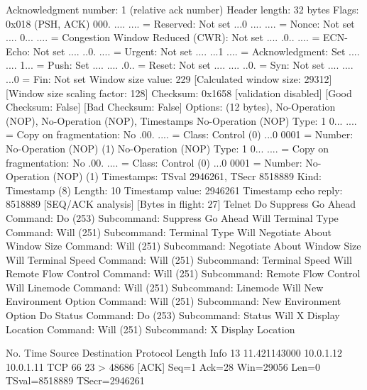     Acknowledgment number: 1    (relative ack number)
    Header length: 32 bytes
    Flags: 0x018 (PSH, ACK)
        000. .... .... = Reserved: Not set
        ...0 .... .... = Nonce: Not set
        .... 0... .... = Congestion Window Reduced (CWR): Not set
        .... .0.. .... = ECN-Echo: Not set
        .... ..0. .... = Urgent: Not set
        .... ...1 .... = Acknowledgment: Set
        .... .... 1... = Push: Set
        .... .... .0.. = Reset: Not set
        .... .... ..0. = Syn: Not set
        .... .... ...0 = Fin: Not set
    Window size value: 229
    [Calculated window size: 29312]
    [Window size scaling factor: 128]
    Checksum: 0x1658 [validation disabled]
        [Good Checksum: False]
        [Bad Checksum: False]
    Options: (12 bytes), No-Operation (NOP), No-Operation (NOP), Timestamps
        No-Operation (NOP)
            Type: 1
                0... .... = Copy on fragmentation: No
                .00. .... = Class: Control (0)
                ...0 0001 = Number: No-Operation (NOP) (1)
        No-Operation (NOP)
            Type: 1
                0... .... = Copy on fragmentation: No
                .00. .... = Class: Control (0)
                ...0 0001 = Number: No-Operation (NOP) (1)
        Timestamps: TSval 2946261, TSecr 8518889
            Kind: Timestamp (8)
            Length: 10
            Timestamp value: 2946261
            Timestamp echo reply: 8518889
    [SEQ/ACK analysis]
        [Bytes in flight: 27]
Telnet
    Do Suppress Go Ahead
        Command: Do (253)
        Subcommand: Suppress Go Ahead
    Will Terminal Type
        Command: Will (251)
        Subcommand: Terminal Type
    Will Negotiate About Window Size
        Command: Will (251)
        Subcommand: Negotiate About Window Size
    Will Terminal Speed
        Command: Will (251)
        Subcommand: Terminal Speed
    Will Remote Flow Control
        Command: Will (251)
        Subcommand: Remote Flow Control
    Will Linemode
        Command: Will (251)
        Subcommand: Linemode
    Will New Environment Option
        Command: Will (251)
        Subcommand: New Environment Option
    Do Status
        Command: Do (253)
        Subcommand: Status
    Will X Display Location
        Command: Will (251)
        Subcommand: X Display Location

No.     Time           Source                Destination           Protocol Length Info
     13 11.421143000   10.0.1.12             10.0.1.11             TCP      66     23 > 48686 [ACK] Seq=1 Ack=28 Win=29056 Len=0 TSval=8518889 TSecr=2946261

